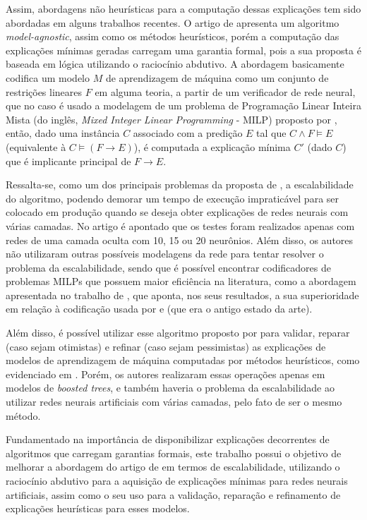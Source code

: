Assim, abordagens não heurísticas para a computação dessas explicações tem sido abordadas em alguns trabalhos recentes. O artigo de  apresenta  um algoritmo \textit{model-agnostic}, assim como os métodos heurísticos, porém a computação das explicações mínimas geradas carregam uma garantia formal, pois a sua proposta é baseada em lógica utilizando o raciocínio abdutivo. A abordagem basicamente codifica um modelo $M$ de aprendizagem de máquina como um conjunto de restrições lineares $F$ em alguma teoria, a partir de um verificador de rede neural, que no caso é usado a modelagem de um problema de Programação Linear Inteira Mista (do inglês, \textit{Mixed Integer Linear Programming} - MILP) proposto por , então, dado uma instância $C$ associado com a predição $E$ tal que $C \wedge F \models E$ (equivalente à $C \models (F \rightarrow E)$), é computada a explicação mínima $C'$ (dado $C$) que é implicante principal de  $F \rightarrow E$.

Ressalta-se, como um dos principais problemas da proposta de , a escalabilidade do algoritmo, podendo demorar um tempo de execução impraticável para ser colocado em produção quando se deseja obter explicações de redes neurais com várias camadas. No artigo é apontado que os testes foram realizados apenas com redes de uma camada oculta com 10, 15 ou 20 neurônios. Além disso, os autores não utilizaram outras possíveis modelagens da rede para tentar resolver o problema da escalabilidade, sendo que é possível encontrar codificadores de problemas MILPs que possuem maior eficiência na literatura, como a abordagem apresentada no trabalho de , que aponta, nos seus resultados, a sua superioridade em relação à codificação usada por  e  (que era o antigo estado da arte). 

Além disso, é possível utilizar esse algoritmo proposto por  para validar, reparar (caso sejam otimistas) e refinar (caso sejam pessimistas) as explicações de modelos de aprendizagem de máquina computadas por métodos heurísticos, como evidenciado em . Porém, os autores realizaram essas operações apenas em modelos de \textit{boosted trees}, e também haveria o problema da escalabilidade ao utilizar redes neurais artificiais com várias camadas, pelo fato de ser o mesmo método. 

Fundamentado na importância de disponibilizar explicações decorrentes de algoritmos que carregam garantias formais, este trabalho possui o objetivo de melhorar a abordagem do artigo de  em termos de escalabilidade, utilizando o raciocínio abdutivo para a aquisição de explicações mínimas para redes neurais artificiais, assim como o seu uso para a validação, reparação e refinamento de explicações heurísticas para esses modelos.%


